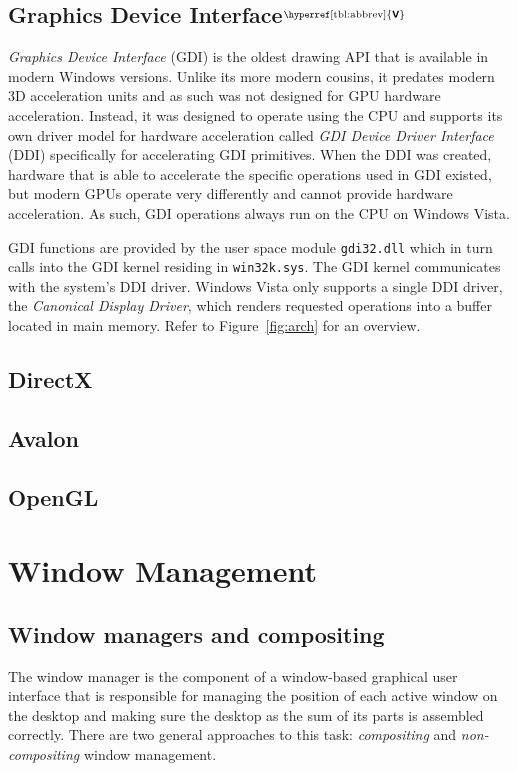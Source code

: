 \documentclass[10pt,twocolumn,a4paper,os=win]{article}
\newcommand{\bs}[1]{\textbf{\sffamily #1}}
\newcommand{\winver}[1]{$^{\text{\hyperref[tbl:abbrev]{\bs{#1}}}}$}
\newcommand{\winsubsection}[2]{\subsection[#1]{#1\winver{#2}}}
\begin{document}
		\winsubsection{Graphics Device Interface}{V} \label{sec:gdi}
			\textit{Graphics Device Interface} (GDI) is the oldest drawing API
			that is available in modern Windows versions. Unlike its more
			modern cousins, it predates modern 3D acceleration units and as such
			was not designed for GPU hardware acceleration. Instead, it was
			designed to operate using the CPU and supports its own driver model
			for hardware acceleration called \textit{GDI Device Driver
			Interface} (DDI) specifically for accelerating GDI
			primitives. When the DDI was created, hardware that is able to
			accelerate the specific operations used in GDI existed, but modern GPUs operate
			very differently and cannot provide hardware acceleration. As such,
			GDI operations always run on the CPU on Windows Vista. \cite{d2dvsgdi}

			GDI functions are provided by the user space module
			\texttt{gdi32.dll} which in turn calls into the GDI kernel residing
			in \texttt{win32k.sys}. The GDI kernel communicates with the
			system's DDI driver. Windows Vista only supports a single DDI driver,
			the \textit{Canonical Display Driver}, which renders requested operations
			into a buffer located in main memory. Refer to Figure~\ref{fig:arch}
			for an overview. \cite{d2dvsgdi, dwmredirect}

		\subsection{DirectX}

		\subsection{Avalon}\label{sec:milcore}

		\subsection{OpenGL}


	\section{Window Management}
		\subsection{Window managers and compositing}
			The window manager is the component of a window-based graphical user
			interface that is responsible for managing the position of each active
			window on the desktop and making sure the desktop as the sum of its
			parts is assembled correctly. There are two general approaches to this
			task: \emph{compositing} and \emph{non-compositing} window management.
\end{document}
